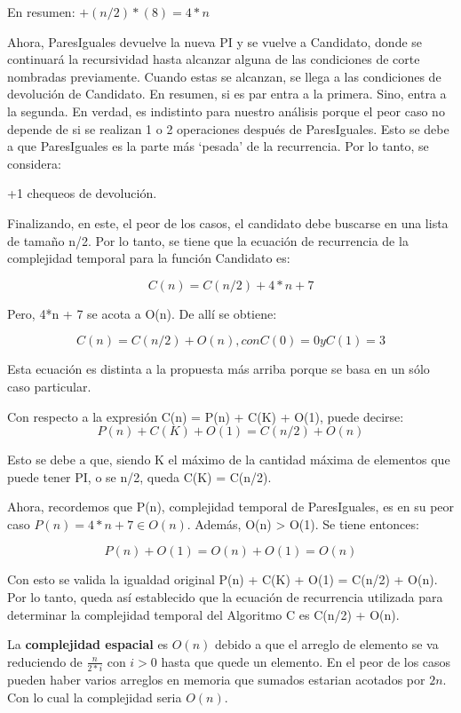\documentclass{article}
\begin{document}
En resumen: \(+(n/2)*(8) = 4*n\)

Ahora, ParesIguales devuelve la nueva PI y se vuelve a Candidato, donde se continuará la 
recursividad hasta alcanzar alguna de las condiciones de corte nombradas previamente. 
Cuando estas se alcanzan, se llega a las condiciones de devolución de Candidato. 
En resumen, si es par entra a la primera. Sino, entra a la segunda. 
En verdad, es indistinto para nuestro análisis porque el peor caso no depende de 
si se realizan 1 o 2 operaciones después de ParesIguales. Esto se debe a que 
ParesIguales es la parte más ‘pesada’ de la recurrencia. Por lo tanto, se considera:

+1 chequeos de devolución.

Finalizando, en este, el peor de los casos, el candidato debe buscarse en una 
lista de tamaño n/2. Por lo tanto, se tiene que la ecuación de recurrencia de la complejidad temporal para la función Candidato es:

\[
    C(n) = C(n/2) + 4*n + 7    
\]

Pero, 4*n + 7 se acota a O(n). De allí se obtiene:

\[
    C(n) = C(n/2) + O(n), con C(0) = 0 y C(1) = 3  
\]

Esta ecuación es distinta a la propuesta más arriba porque se basa en un sólo caso particular.

Con respecto a la expresión C(n) = P(n) + C(K) + O(1), puede decirse: 
\[
    P(n) + C(K) + O(1) = C(n/2) + O(n)    
\]

Esto se debe a que, siendo K el máximo de la cantidad máxima de elementos que puede tener PI, 
o se n/2, queda C(K) = C(n/2).

Ahora, recordemos que P(n), complejidad temporal de ParesIguales, es en su peor caso \(P(n) = 4*n + 7 \in O(n)\).
Además, O(n) > O(1). Se tiene entonces:

\[
    P(n) + O(1) = O(n) + O(1) = O(n)  
\]

Con esto se valida la igualdad original P(n) + C(K) + O(1) = C(n/2) + O(n). 
Por lo tanto, queda así establecido que la ecuación de recurrencia utilizada 
para determinar la complejidad temporal del Algoritmo C es C(n/2) + O(n).

La \textbf{complejidad espacial} es \(O(n)\) debido a que el arreglo de elemento se va reduciendo de \( \frac{n}{2*i} \) con \(i > 0\) hasta que quede un elemento. 
En el peor de los casos pueden haber varios arreglos en memoria que sumados estarian acotados por \(2n\). 
Con lo cual la complejidad seria \(O(n)\).
\end{document}
